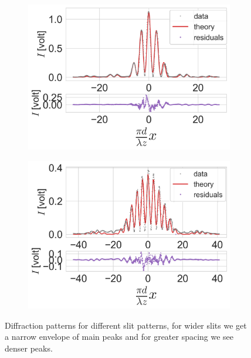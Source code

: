 \begin{figure}[H]
    \centering
    \begin{subfigure}{0.5\columnwidth}
        \centering
        \includegraphics[width=\columnwidth]{figures/0.08w0.25s.png} %
        \caption{}
        \label{fig:double slit interference 0.08w0.25s}
    \end{subfigure}\hfill
    \begin{subfigure}{0.5\columnwidth}
        \centering
        \includegraphics[width=\columnwidth]{figures/0.08w0.5s.png} %
        \caption{}
        \label{fig:double slit interference 0.080.5s}
    \end{subfigure}
    \caption{Diffraction patterns for different slit patterns, for wider slits we get a narrow envelope of main peaks and for greater spacing we see denser peaks.}
\end{figure}
